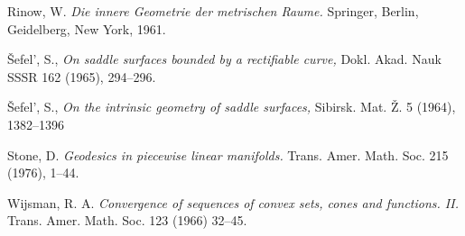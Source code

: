 \begin{thebibliography}{52}
Rinow, W. 
\textit{Die innere Geometrie der metrischen Raume.} Springer, Berlin, Geidelberg, New York, 1961.

\v{S}efel', S.,
\textit{On saddle surfaces bounded by a rectifiable curve,} 
Dokl. Akad. Nauk SSSR 
162 
(1965), 
294--296.

\v{S}efel', S., 
\textit{On the intrinsic geometry of saddle surfaces,} Sibirsk. Mat. \v{Z}. 
5 
(1964), 
1382--1396

Stone, D.
\textit{Geodesics in piecewise linear manifolds.}
Trans. Amer. Math. Soc. 
215 
(1976), 
1--44.

 Wijsman, R. A. 
\textit{Convergence of sequences of convex sets, cones and functions. II.} 
Trans. Amer. Math. Soc. 
123 (1966) 32--45.


\end{thebibliography}
